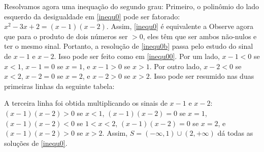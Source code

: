 \begin{ex} Resolvamos agora uma inequação do segundo grau:
Primeiro, o polinômio do lado esquerdo da desigualdade em \eqref{inequ0} pode ser
fatorado: 
$x^2-3x+2=(x-1)(x-2)$. Assim, \eqref{inequ0} é equivalente a
 Observe agora que para o produto de dois números ser $> 0$, eles têm que ser ambos
não-nulos e ter o mesmo sinal. Portanto, a resolução de \eqref{inequ0b} passa pelo estudo
do sinal de $x-1$ e $x-2$. Isso pode ser feito como em \eqref{inequ00}.
Por um lado, $x-1<0$ se $x<1$, $x-1=0$ se $x=1$, e $x-1>0$ se $x>1$. 
Por outro lado, $x-2<0$ se $x<2$, $x-2=0$ se $x=2$, e $x-2>0$ se $x>2$. 
Isso pode ser resumido nas duas primeiras linhas da seguinte tabela:
\begin{center}
\begin{bmlimage}\end{bmlimage}
\end{center}
A terceira linha foi obtida multiplicando os sinais de $x-1$ e $x-2$: 
$(x-1)(x-2)>0$ se $x<1$, $(x-1)(x-2)=0$ se $x=1$,
$(x-1)(x-2)<0$ se $1<x<2$, $(x-1)(x-2)=0$ se $x=2$, e $(x-1)(x-2)>0$ se $x>2$.
Assim, $S=(-\infty,1)\cup (2,+\infty)$ dá todas as soluções de \eqref{inequ0}.
\end{ex}

